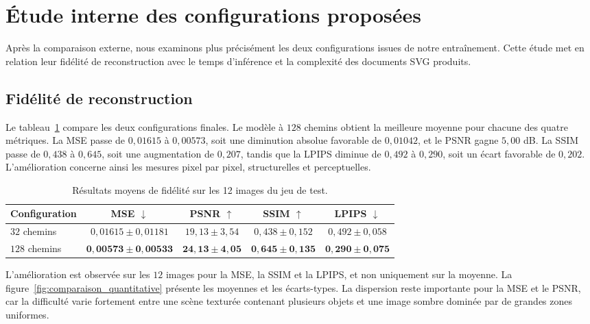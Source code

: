 \documentclass[12pt, a4paper, oneside]{report}
\begin{document}
\section{Étude interne des configurations proposées}
\label{sec:resultats_quantitatifs}

Après la comparaison externe, nous examinons plus précisément les deux configurations issues de notre entraînement. Cette étude met en relation leur fidélité de reconstruction avec le temps d'inférence et la complexité des documents SVG produits.

\subsection{Fidélité de reconstruction}

Le tableau~\ref{tab:resultats_fidelite} compare les deux configurations finales. Le modèle à $128$ chemins obtient la meilleure moyenne pour chacune des quatre métriques. La MSE passe de $0{,}01615$ à $0{,}00573$, soit une diminution absolue favorable de $0{,}01042$, et le PSNR gagne $5{,}00$ dB. La SSIM passe de $0{,}438$ à $0{,}645$, soit une augmentation de $0{,}207$, tandis que la LPIPS diminue de $0{,}492$ à $0{,}290$, soit un écart favorable de $0{,}202$. L'amélioration concerne ainsi les mesures pixel par pixel, structurelles et perceptuelles.

\begin{table}[H]
    \centering
    \small
    \caption{Résultats moyens de fidélité sur les 12 images du jeu de test.}
    \label{tab:resultats_fidelite}
    \begin{tabular}{lcccc}
        \toprule
        \textbf{Configuration} & \textbf{MSE $\downarrow$} & \textbf{PSNR $\uparrow$} & \textbf{SSIM $\uparrow$} & \textbf{LPIPS $\downarrow$} \\
        \midrule
        $32$ chemins  & $0{,}01615 \pm 0{,}01181$ & $19{,}13 \pm 3{,}54$ & $0{,}438 \pm 0{,}152$ & $0{,}492 \pm 0{,}058$ \\
        $128$ chemins & $\mathbf{0{,}00573 \pm 0{,}00533}$ & $\mathbf{24{,}13 \pm 4{,}05}$ & $\mathbf{0{,}645 \pm 0{,}135}$ & $\mathbf{0{,}290 \pm 0{,}075}$ \\
        \bottomrule
    \end{tabular}
\end{table}

L'amélioration est observée sur les $12$ images pour la MSE, la SSIM et la LPIPS, et non uniquement sur la moyenne. La figure~\ref{fig:comparaison_quantitative} présente les moyennes et les écarts-types. La dispersion reste importante pour la MSE et le PSNR, car la difficulté varie fortement entre une scène texturée contenant plusieurs objets et une image sombre dominée par de grandes zones uniformes.
\end{document}
